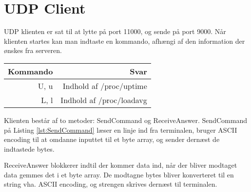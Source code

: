 \section{UDP Client}
UDP klienten er sat til at lytte på port 11000, og sende på port 9000. Når klienten startes kan man indtaste en kommando, afhængi af den information der ønskes fra serveren. \\

\begin{tabular}{r|r}
\hline
    Kommando & Svar  \\ \hline
    U, u & Indhold af /proc/uptime \\ \hline
    L, l & Indhold af /proc/loadavg \\
\hline
\end{tabular}
\vspace{.5cm}


Klienten består af to metoder: SendCommand og ReceiveAnswer. SendCommand på Listing \ref{lst:SendCommand} læser en linje ind fra terminalen, bruger ASCII encoding til at omdanne inputtet til et byte array, og sender dernæst de indtastede bytes.



ReceiveAnswer blokkerer indtil der kommer data ind, når der bliver modtaget data gemmes det i et byte array. De modtagne bytes bliver konverteret til en string vha. ASCII encoding, og strengen skrives dernæst til terminalen.

